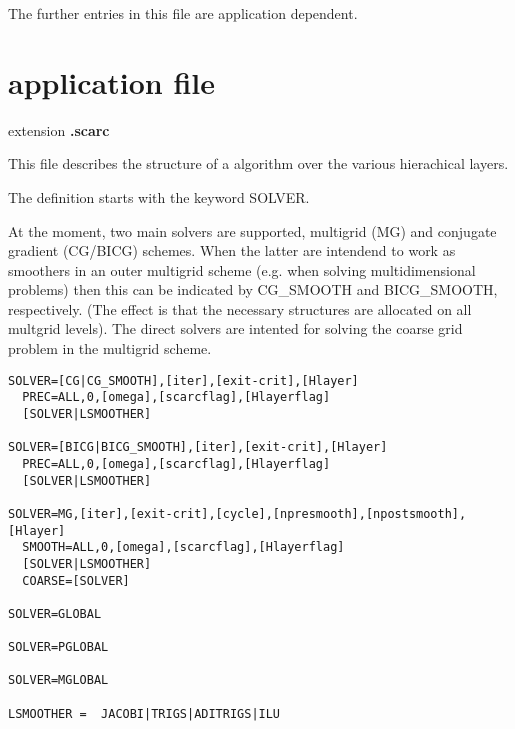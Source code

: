 The further entries in this file are application dependent.


\section{\scarc{} application file}

extension {\bf .scarc}

This file describes the structure of a \scarc{} algorithm over the
various hierachical layers.

The definition starts with the keyword SOLVER.

At the moment, two main solvers are supported, multigrid (MG) and 
conjugate gradient (CG/BICG) schemes. When the latter are intendend to work as
smoothers in an outer multigrid scheme (e.g. when solving multidimensional problems)
then this can be indicated by CG\_SMOOTH and BICG\_SMOOTH, respectively. (The effect is
that the necessary structures are allocated on all multgrid levels). The direct solvers are intented for solving the coarse grid problem in the multigrid scheme.

\begin{verbatim}
SOLVER=[CG|CG_SMOOTH],[iter],[exit-crit],[Hlayer]
  PREC=ALL,0,[omega],[scarcflag],[Hlayerflag]
  [SOLVER|LSMOOTHER]

SOLVER=[BICG|BICG_SMOOTH],[iter],[exit-crit],[Hlayer]
  PREC=ALL,0,[omega],[scarcflag],[Hlayerflag]
  [SOLVER|LSMOOTHER]  

SOLVER=MG,[iter],[exit-crit],[cycle],[npresmooth],[npostsmooth],[Hlayer]
  SMOOTH=ALL,0,[omega],[scarcflag],[Hlayerflag]
  [SOLVER|LSMOOTHER]
  COARSE=[SOLVER]

SOLVER=GLOBAL

SOLVER=PGLOBAL

SOLVER=MGLOBAL
 
LSMOOTHER =  JACOBI|TRIGS|ADITRIGS|ILU
\end{verbatim}

